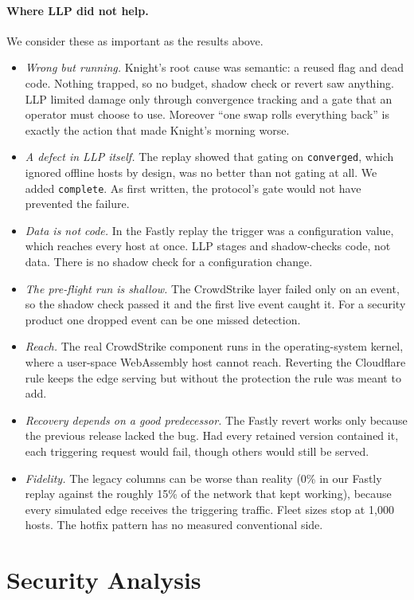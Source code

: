 \documentclass[10pt,twocolumn]{article}
\newcommand{\code}[1]{\texttt{#1}}
\begin{document}
\paragraph{Where LLP did not help.} We consider these as important as the results above.
\begin{itemize}
\item \emph{Wrong but running.} Knight's root cause was semantic: a reused flag and dead code.
Nothing trapped, so no budget, shadow check or revert saw anything. LLP limited damage only
through convergence tracking and a gate that an operator must choose to use. Moreover ``one swap
rolls everything back'' is exactly the action that made Knight's morning worse.
\item \emph{A defect in LLP itself.} The replay showed that gating on \code{converged}, which
ignored offline hosts by design, was no better than not gating at all. We added \code{complete}.
As first written, the protocol's gate would not have prevented the failure.
\item \emph{Data is not code.} In the Fastly replay the trigger was a configuration value, which
reaches every host at once. LLP stages and shadow-checks code, not data. There is no shadow check
for a configuration change.
\item \emph{The pre-flight run is shallow.} The CrowdStrike layer failed only on an event, so the
shadow check passed it and the first live event caught it. For a security product one dropped
event can be one missed detection.
\item \emph{Reach.} The real CrowdStrike component runs in the operating-system kernel, where a
user-space WebAssembly host cannot reach. Reverting the Cloudflare rule keeps the edge serving but
without the protection the rule was meant to add.
\item \emph{Recovery depends on a good predecessor.} The Fastly revert works only because the
previous release lacked the bug. Had every retained version contained it, each triggering request
would fail, though others would still be served.
\item \emph{Fidelity.} The legacy columns can be worse than reality (0\% in our Fastly replay
against the roughly 15\% of the network that kept working), because every simulated edge receives
the triggering traffic. Fleet sizes stop at 1{,}000 hosts. The hotfix pattern has no measured
conventional side.
\end{itemize}

\section{Security Analysis}
\label{sec:security}
\end{document}
